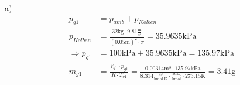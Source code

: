 a) 
\begin{align*}
    p_{g1} &= p_{amb} + p_{Kolben} \\
    p_{Kolben} &= \frac{32 \text{kg} \cdot 9.81 \frac{\text{m}}{\text{s}^2}}{(0.05 \text{m})^2 \cdot \pi} = 35.9635 \text{kPa} \\
    \Rightarrow p_{g1} &= 100 \text{kPa} + 35.9635 \text{kPa} = 135.97 \text{kPa} \\
    m_{g1} &= \frac{V_{g1} \cdot p_{g1}}{R \cdot T_{g1}} = \frac{0.00314 \text{m}^3 \cdot 135.97 \text{kPa}}{8.314 \frac{\text{kJ}}{\text{kmol K}} \cdot \frac{50 \text{kg}}{\text{kmol}} \cdot 273.15 \text{K}} = 3.41 \text{g}
\end{align*}
